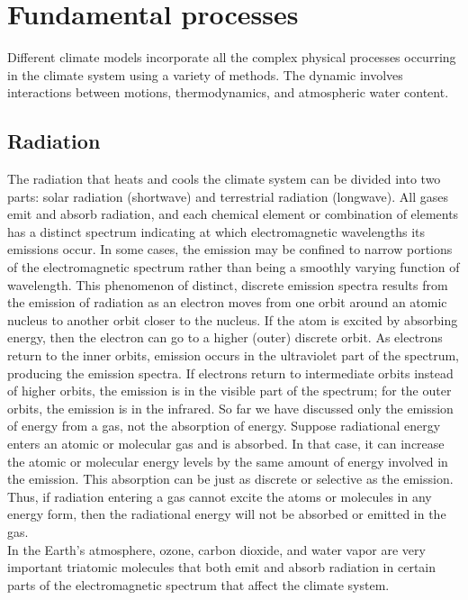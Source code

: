 \section{Fundamental processes}
Different climate models incorporate all the complex physical processes occurring in the climate system using a variety of methods. The dynamic involves interactions between motions, thermodynamics, and atmospheric water content. 

\subsection{Radiation}
The radiation that heats and cools the climate system can be divided into two parts: solar radiation (shortwave) and terrestrial radiation (longwave). 
All gases emit and absorb radiation, and each chemical element or combination of elements has a distinct spectrum indicating at which electromagnetic wavelengths its emissions occur. In some cases, the emission may be confined to narrow portions of the electromagnetic spectrum rather than being a smoothly varying function of wavelength. This phenomenon of distinct, discrete emission spectra results from the emission of radiation as an electron moves from one orbit around an atomic nucleus to another orbit closer to the nucleus. If the atom is excited by absorbing energy, then the electron can go to a higher (outer) discrete orbit. 
As electrons return to the inner orbits, emission occurs in the ultraviolet part of the spectrum, producing the emission spectra. If electrons return to intermediate orbits instead of higher orbits, the emission is in the visible part of the spectrum; for the outer orbits, the emission is in the infrared.  
So far we have discussed only the emission of energy from a gas, not the absorption of energy. Suppose radiational energy enters an atomic or molecular gas and is absorbed. In that case, it can increase the atomic or molecular energy levels by the same amount of energy involved in the emission. This absorption can be just as discrete or selective as the emission. Thus, if radiation entering a gas cannot excite the atoms or molecules in any energy form, then the radiational energy will not be absorbed or emitted in the gas.\\


In the Earth's atmosphere, ozone, carbon dioxide, and water vapor are very important triatomic molecules that both emit and absorb radiation in certain parts of the electromagnetic spectrum that affect the climate system.

